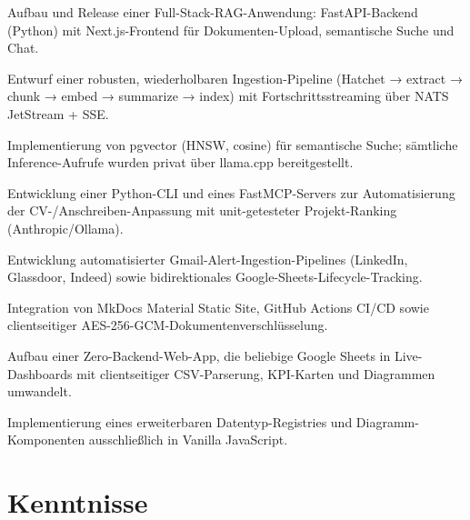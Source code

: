 \documentclass[10pt,a4paper]{resume}
\begin{document}
\bullets
  \item Aufbau und Release einer Full-Stack-RAG-Anwendung: FastAPI-Backend (Python) mit Next.js-Frontend für Dokumenten-Upload, semantische Suche und Chat.
  \item Entwurf einer robusten, wiederholbaren Ingestion-Pipeline (Hatchet → extract → chunk → embed → summarize → index) mit Fortschrittsstreaming über NATS JetStream + SSE.
  \item Implementierung von pgvector (HNSW, cosine) für semantische Suche; sämtliche Inference-Aufrufe wurden privat über llama.cpp bereitgestellt.
\bulletsend
\vspace{1.0pt}
\bullets
  \item Entwicklung einer Python-CLI und eines FastMCP-Servers zur Automatisierung der CV-/Anschreiben-Anpassung mit unit-getesteter Projekt-Ranking (Anthropic/Ollama).
  \item Entwicklung automatisierter Gmail-Alert-Ingestion-Pipelines (LinkedIn, Glassdoor, Indeed) sowie bidirektionales Google-Sheets-Lifecycle-Tracking.
  \item Integration von MkDocs Material Static Site, GitHub Actions CI/CD sowie clientseitiger AES-256-GCM-Dokumentenverschlüsselung.
\bulletsend
\vspace{1.0pt}
\bullets
  \item Aufbau einer Zero-Backend-Web-App, die beliebige Google Sheets in Live-Dashboards mit clientseitiger CSV-Parserung, KPI-Karten und Diagrammen umwandelt.
  \item Implementierung eines erweiterbaren Datentyp-Registries und Diagramm-Komponenten ausschließlich in Vanilla JavaScript.
\bulletsend

\section{Kenntnisse}
\end{document}
